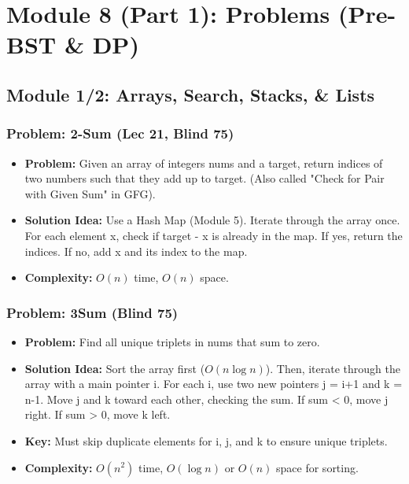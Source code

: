 
\section{Module 8 (Part 1): Problems (Pre-BST \& DP)}

\subsection{Module 1/2: Arrays, Search, Stacks, \& Lists}

\subsubsection{Problem: 2-Sum (Lec 21, Blind 75)}
\begin{itemize}
\item \textbf{Problem:} Given an array of integers nums and a target, return indices of two numbers such that they add up to target. (Also called "Check for Pair with Given Sum" in GFG).
\item \textbf{Solution Idea:} Use a Hash Map (Module 5). Iterate through the array once. For each element x, check if target - x is already in the map. If yes, return the indices. If no, add x and its index to the map.
\item \textbf{Complexity:} $O(n)$ time, $O(n)$ space.
\end{itemize}

\subsubsection{Problem: 3Sum (Blind 75)}
\begin{itemize}
\item \textbf{Problem:} Find all unique triplets in nums that sum to zero.
\item \textbf{Solution Idea:} Sort the array first ($O(n \log n)$). Then, iterate through the array with a main pointer i. For each i, use two new pointers j = i+1 and k = n-1. Move j and k toward each other, checking the sum. If sum < 0, move j right. If sum > 0, move k left.
\item \textbf{Key:} Must skip duplicate elements for i, j, and k to ensure unique triplets.
\item \textbf{Complexity:} $O(n^2)$ time, $O(\log n)$ or $O(n)$ space for sorting.
\end{itemize}

